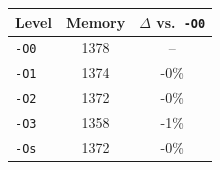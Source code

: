 \begin{tabular*}{\columnwidth}{@{\extracolsep\fill}lcc@{\extracolsep\fill}}
\toprule
\textbf{Level} & \textbf{Memory} & \textbf{$\Delta$ vs.\ \texttt{-O0}} \\
\midrule
\texttt{-O0} & 1378 & -- \\
\texttt{-O1} & 1374 & -0\% \\
\texttt{-O2} & 1372 & -0\% \\
\texttt{-O3} & 1358 & -1\% \\
\texttt{-Os} & 1372 & -0\% \\
\bottomrule
\end{tabular*}
